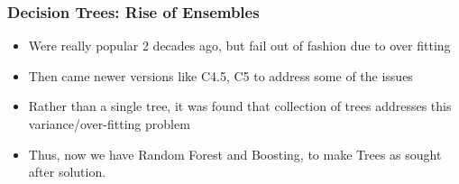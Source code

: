 \begin{frame}[fragile]\frametitle{Decision Trees: Rise of Ensembles}
\begin{itemize}
			\item Were really popular 2 decades ago, but fail out of fashion due to over fitting
			\item Then came newer versions like C4.5, C5 to address some of the issues
			\item Rather than a single tree, it was found that collection of trees addresses this variance/over-fitting problem
			\item Thus, now we have Random Forest and Boosting, to make Trees as sought after solution.
\end{itemize}
\end{frame}






